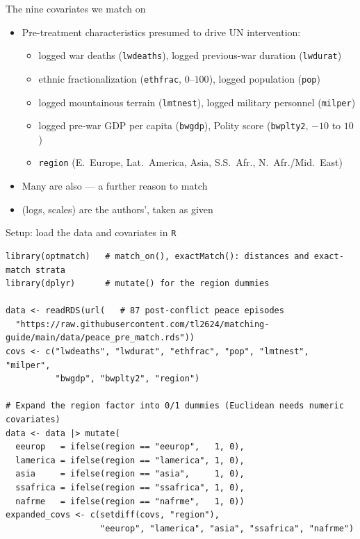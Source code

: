 \documentclass[table, xcolor = {dvipsnames}, 9pt]{beamer}
\theoremstyle{plain}
\newcommand{\mh}[1]{{\color{magenta}{#1}}}
\begin{document}
\begin{frame}[t]{The nine covariates we match on}
\vfill
\begin{itemize} \vfill
\item Pre-treatment characteristics presumed to drive UN intervention: \vfill
\begin{itemize} \vfill
\item logged war deaths (\texttt{lwdeaths}), logged previous-war duration (\texttt{lwdurat}) \vfill
\item ethnic fractionalization (\texttt{ethfrac}, $0$--$100$), logged population (\texttt{pop}) \vfill
\item logged mountainous terrain (\texttt{lmtnest}), logged military personnel (\texttt{milper}) \vfill
\item logged pre-war GDP per capita (\texttt{bwgdp}), Polity score (\texttt{bwplty2}, $-10$ to $10$) \vfill
\item \texttt{region} (E.\ Europe, Lat.\ America, Asia, S.S.\ Afr., N.\ Afr./Mid.\ East) \vfill
\end{itemize} \vfill
\item Many are also \mh{prognostic} --- a further reason to match \\ \citep{hansen2008a,salesetal2018} \vfill
\item \mh{Transformations} (logs, scales) are the authors', taken as given \vfill
\end{itemize} \vfill
\end{frame}
\begin{frame}[fragile]{Setup: load the data and covariates in \texttt{R}}
\begin{lstlisting}[style=Rstyle, basicstyle=\ttfamily\tiny, frame=single]
library(optmatch)   # match_on(), exactMatch(): distances and exact-match strata
library(dplyr)      # mutate() for the region dummies

data <- readRDS(url(   # 87 post-conflict peace episodes
  "https://raw.githubusercontent.com/tl2624/matching-guide/main/data/peace_pre_match.rds"))
covs <- c("lwdeaths", "lwdurat", "ethfrac", "pop", "lmtnest", "milper",
          "bwgdp", "bwplty2", "region")

# Expand the region factor into 0/1 dummies (Euclidean needs numeric covariates)
data <- data |> mutate(
  eeurop   = ifelse(region == "eeurop",   1, 0),
  lamerica = ifelse(region == "lamerica", 1, 0),
  asia     = ifelse(region == "asia",     1, 0),
  ssafrica = ifelse(region == "ssafrica", 1, 0),
  nafrme   = ifelse(region == "nafrme",   1, 0))
expanded_covs <- c(setdiff(covs, "region"),
                   "eeurop", "lamerica", "asia", "ssafrica", "nafrme")
\end{lstlisting}
\end{frame}
\end{document}
